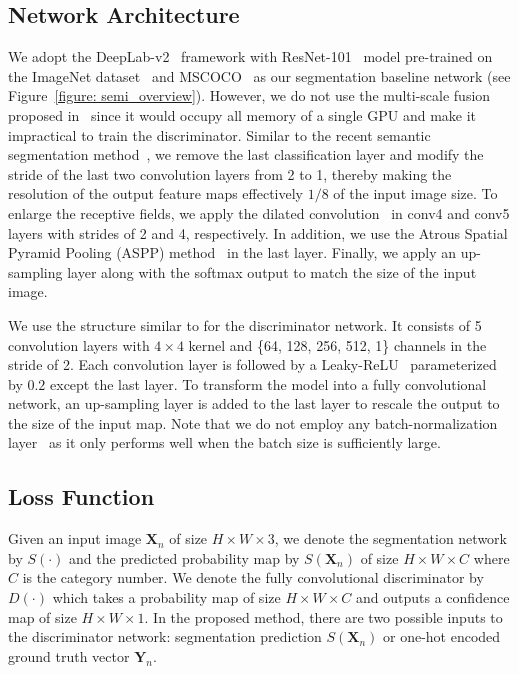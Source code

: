 \documentclass{bmvc2k}
\begin{document}
	\subsection{Network Architecture}
	\vspace{-2mm}{\flushleft \bf Segmentation network.}
	We adopt the DeepLab-v2~\cite{deeplab} framework with ResNet-101~\cite{resnet} model pre-trained on the ImageNet dataset~\cite{imagenet} and MSCOCO~\cite{lin2014microsoft} as our segmentation baseline network 
	(see Figure~\ref{figure: semi_overview}).
	However, we do not use the multi-scale fusion proposed in~\cite{deeplab} since it 
	would occupy all memory of a single GPU and make it impractical 
	to train the discriminator.
	Similar to the recent semantic segmentation method~\cite{deeplab,dilated}, we remove the last classification layer and modify the stride of the last two convolution layers from 2 to 1,
	thereby making the resolution of the output feature maps effectively $1/8$  
	of the input image size.
	To enlarge the receptive fields, we apply the dilated convolution~\cite{dilated} in conv4 and conv5 layers with strides of 2 and 4, respectively.
	In addition, we use the Atrous Spatial Pyramid Pooling (ASPP) method~\cite{deeplab} in the last layer. 
	Finally, we apply an up-sampling layer along with the softmax output to match the size of the input image.
	
	\vspace{-2mm}{\flushleft \bf Discriminator network.}
	We use the structure similar to \cite{dcgan} for the discriminator network.
	It consists of 5 convolution layers with $4 \times 4$ kernel and \{64, 128, 256, 512, 1\} channels in the stride of 2. 
	Each convolution layer is followed by a Leaky-ReLU~\cite{maas2013rectifier} parameterized by $0.2$ except the last layer.
	To transform the model into a fully convolutional network, an up-sampling layer is added to the last layer to rescale the output to the size of the input map.
	Note that we do not employ any batch-normalization layer~\cite{ioffe2015batch} as it only performs well when the batch size is sufficiently large. 
	
	\vspace{-2mm}
	\subsection{Loss Function}
	\label{section: training}
	
	Given an input image $\mathbf{X}_n$ of size $H \times W \times 3$, we denote the segmentation network by $S(\cdot)$ and the predicted probability map by $S(\mathbf{X}_n)$ of size $H \times W \times C$ where $C$ is the category number.
	We denote the fully convolutional discriminator by $D(\cdot)$ which takes a probability map 
	of  size $H \times W \times C$ and outputs a confidence map of size $H \times W \times 1$. 
	In the proposed method, there are two possible inputs to the discriminator network: 
	segmentation prediction $S(\mathbf{X}_n)$ or one-hot encoded ground truth vector 
	$\mathbf{Y}_n$.
	
\end{document}
